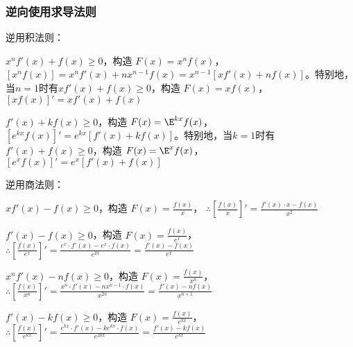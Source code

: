 \subsubsection{逆向使用求导法则}

逆用积法则：

$x^n f'(x) + f(x) \geq 0$，构造 $F(x) = x^n f(x)$，$[x^n f(x)] = x^n f'(x) + nx^{n-1} f(x) = x^{n-1} [x f'(x) + nf(x)]$。特别地，当$n=1$时有$x f'(x) + f(x) \geq 0$，构造 $F(x) = x f(x)$，$[x f(x)]' = x f'(x) + f(x)$

$f'(x) + k f(x) \geq 0$，构造 $F(x) = \E^{kx} f(x)$，$[e^{kx} f(x)]' = e^{kx} [f'(x) + kf(x)]$。特别地，当$k=1$时有$f'(x) + f(x) \geq 0$，构造 $F(x) = \E^x f(x)$，$[e^x f(x)]' = e^x [f'(x) + f(x)]$

逆用商法则：

$xf'(x) - f(x) \geq 0$，构造 $F(x) = \frac{f(x)}{x}$，  
    $\therefore \left[\frac{f(x)}{x}\right]' = \frac{f'(x) \cdot x - f(x)}{x^2}$

$f'(x) - f(x) \geq 0$，构造 $F(x) = \frac{f(x)}{e^x}$，  
    $\therefore \left[\frac{f(x)}{e^x}\right]' = \frac{e^x \cdot f'(x) - e^x \cdot f(x)}{e^{2x}} = \frac{f'(x) - f(x)}{e^x}$

$x^n f'(x) - n f(x) \geq 0$，构造 $F(x) = \frac{f(x)}{x^n}$，  
    $\therefore \left[\frac{f(x)}{x^n}\right]' = \frac{x^n \cdot f'(x) - n x^{n-1} \cdot f(x)}{x^{2n}} = \frac{f'(x) - n f(x)}{x^{n+1}}$

$f'(x) - k f(x) \geq 0$，构造 $F(x) = \frac{f(x)}{e^{kx}}$，  
    $\therefore \left[\frac{f(x)}{e^{kx}}\right]' = \frac{e^{kx} \cdot f'(x) - k e^{kx} \cdot f(x)}{e^{2kx}} = \frac{f'(x) - k f(x)}{e^{kx}}$

